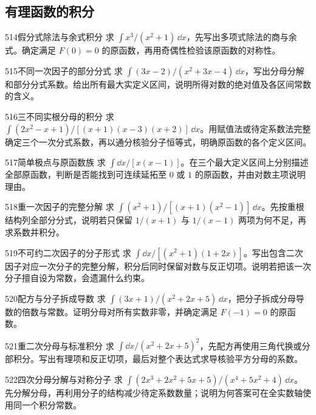 \subsection{有理函数的积分}
\begin{exercise}{514}{假分式除法与余式积分}
求 $\int x^3/(x^2+1)\,\dd x$，先写出多项式除法的商与余式。确定满足 $F(0)=0$ 的原函数，再用奇偶性检验该原函数的对称性。
\end{exercise}
\begin{exercise}{515}{不同一次因子的部分分式}
求 $\int(3x-2)/(x^2+3x-4)\,\dd x$，写出分母分解和部分分式系数。给出所有最大实定义区间，说明所得对数的绝对值及各区间常数的含义。
\end{exercise}
\begin{exercise}{516}{三不同实根分母的积分}
求 $\int(2x^2-x+1)/[(x+1)(x-3)(x+2)]\,\dd x$。用赋值法或待定系数法完整确定三个一次分式系数，再以通分核验分子恒等式，明确原函数的各个定义区间。
\end{exercise}
\begin{exercise}{517}{简单极点与原函数族}
求 $\int\dd x/[x(x-1)]$。在三个最大定义区间上分别描述全部原函数，判断是否能找到可连续延拓至 $0$ 或 $1$ 的原函数，并由对数主项说明理由。
\end{exercise}
\begin{exercise}{518}{重一次因子的完整分解}
求 $\int(x^2+1)/[(x+1)(x^2-1)]\,\dd x$。先按重根结构列全部分分式，说明若只保留 $1/(x+1)$ 与 $1/(x-1)$ 两项为何不足，再求系数并积分。
\end{exercise}
\begin{exercise}{519}{不可约二次因子的分子形式}
求 $\int\dd x/[(x^2+1)(1+2x)]$。写出包含二次因子对应一次分子的完整分解，积分后同时保留对数与反正切项。说明若把该一次分子擅自设为常数，会遗漏什么约束。
\end{exercise}
\begin{exercise}{520}{配方与分子拆成导数}
求 $\int(3x+1)/(x^2+2x+5)\,\dd x$，把分子拆成分母导数的倍数与常数。证明分母对所有实数非零，并确定满足 $F(-1)=0$ 的原函数。
\end{exercise}
\begin{exercise}{521}{重二次分母与标准积分}
求 $\int\dd x/(x^2+2x+5)^2$，先配方再使用三角代换或分部积分。写出有理项和反正切项，最后对整个表达式求导核验平方分母的系数。
\end{exercise}
\begin{exercise}{522}{四次分母分解与对称分子}
求 $\int(2x^3+2x^2+5x+5)/(x^4+5x^2+4)\,\dd x$。先分解分母，再利用分子的结构减少待定系数数量；说明为何答案可在全实数轴使用同一个积分常数。
\end{exercise}
